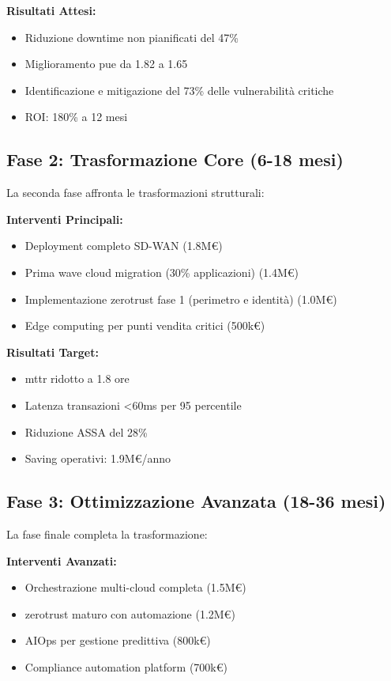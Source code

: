 \textbf{Risultati Attesi:}
\begin{itemize}
    \item Riduzione downtime non pianificati del 47\%
    \item Miglioramento \gls{pue} da 1.82 a 1.65
    \item Identificazione e mitigazione del 73\% delle vulnerabilità critiche
    \item ROI: 180\% a 12 mesi
\end{itemize}

\subsection{\texorpdfstring{Fase 2: Trasformazione Core (6-18 mesi)}{3.6.2 - Fase 2: Trasformazione Core (6-18 mesi)}}

La seconda fase affronta le trasformazioni strutturali:

\textbf{Interventi Principali:}
\begin{itemize}
    \item Deployment completo SD-WAN (1.8M€)
    \item Prima wave cloud migration (30\% applicazioni) (1.4M€)
    \item Implementazione \gls{zerotrust} fase 1 (perimetro e identità) (1.0M€)
    \item Edge computing per punti vendita critici (500k€)
\end{itemize}

\textbf{Risultati Target:}
\begin{itemize}
    \item \gls{mttr} ridotto a 1.8 ore
    \item Latenza transazioni <60ms per 95 percentile
    \item Riduzione ASSA del 28\%
    \item Saving operativi: 1.9M€/anno
\end{itemize}

\subsection{\texorpdfstring{Fase 3: Ottimizzazione Avanzata (18-36 mesi)}{3.6.3 - Fase 3: Ottimizzazione Avanzata (18-36 mesi)}}

La fase finale completa la trasformazione:

\textbf{Interventi Avanzati:}
\begin{itemize}
    \item Orchestrazione multi-cloud completa (1.5M€)
    \item \gls{zerotrust} maturo con automazione (1.2M€)
    \item AIOps per gestione predittiva (800k€)
    \item Compliance automation platform (700k€)
\end{itemize}

